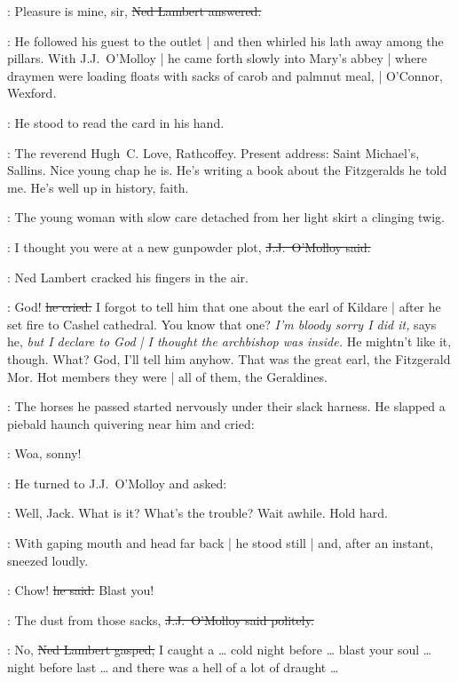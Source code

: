 \lambert:
Pleasure is mine, sir,
\sout{Ned Lambert answered.}

:
He followed his guest to the outlet |
and then whirled his lath away among the pillars.
With J.J.~O'Molloy |
he came forth slowly into Mary's abbey |
where draymen were loading floats
with sacks of carob and palmnut meal, |
O'Connor, Wexford.

:
He stood to read the card in his hand.

\lambert:
The reverend Hugh~C. Love, Rathcoffey.
Present address:
Saint Michael's, Sallins.
Nice young chap he is.
He's writing a book about the Fitzgeralds he told me.
He's well up in history, faith.

\begin{interject}
    :
    The young woman with slow care
    detached from her light skirt a clinging twig.
\end{interject}%

\jjom:
I thought you were at a new gunpowder plot,
\sout{J.J.~O'Molloy said.}

:
Ned Lambert cracked his fingers in the air.

\lambert:
God!
\sout{he cried.}
I forgot to tell him that one about the earl of Kildare |
after he set fire to Cashel cathedral.
You know that one?
\emph{I'm bloody sorry I did it,}
says he,
\emph{but I declare to God |
I thought the archbishop was inside.}
He mightn't like it, though.
What?
God, I'll tell him anyhow.
That was the great earl, the Fitzgerald Mor.
Hot members they were |
all of them, the Geraldines.

:
The horses he passed
started nervously%
under their slack harness.
He slapped a piebald haunch quivering near him and cried:

\lambert:
Woa, sonny!

:
He turned to J.J.~O'Molloy and asked:

\lambert:
Well, Jack.
What is it?
What's the trouble?
Wait awhile.
Hold hard.

:
With gaping mouth and head far back |
he stood still |
and, after an instant,
sneezed loudly.

\lambert:
Chow!
\sout{he said.}
Blast you!

\jjom:
The dust from those sacks,
\sout{J.J.~O'Molloy said politely.}

\lambert:
No,
\sout{Ned Lambert gasped,}
I caught a \ldots
cold night before \ldots
blast your soul \ldots%
night before last \ldots
and there was a hell of a lot of draught \ldots

